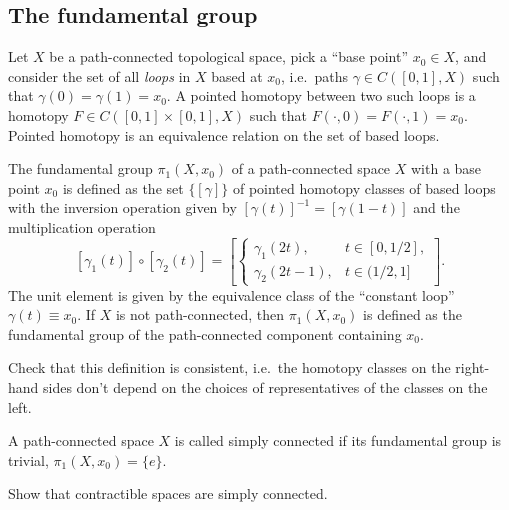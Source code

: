 \subsection{The fundamental group}

\begin{defn}
Let $X$ be a path-connected topological space, pick a ``base point'' $x_0\in X$, and consider the set of all \emph{loops} in $X$ based at $x_0$, i.e.\ paths $\gamma\in C([0,1], X)$ such that $\gamma(0)=\gamma(1)=x_0$. A pointed homotopy between two such loops is a homotopy $F\in C([0,1]\times[0,1],X)$ such that $F(\cdot,0)=F(\cdot,1)=x_0$. Pointed homotopy is an equivalence relation on the set of based loops.
\end{defn}

\begin{defn}
The fundamental group $\pi_1(X,x_0)$ of a path-connected space $X$ with a base point $x_0$ is defined as the set $\{ [\gamma]\}$ of pointed homotopy classes of based loops with the inversion operation given by $[\gamma(t)]^{-1}=[\gamma(1-t)]$ and the multiplication operation 
\[
[\gamma_1(t)]\circ [\gamma_2(t)]=\left[ \begin{cases} \gamma_1(2t), & t\in[0,1/2], \\ \gamma_2(2t-1), & t\in(1/2,1] \end{cases}\right].\label{pi1 group op}
\]
The unit element is given by the equivalence class of the ``constant loop'' $\gamma(t)\equiv x_0$. If $X$ is not path-connected, then $\pi_1(X,x_0)$ is defined as the fundamental group of the path-connected component containing $x_0$.
\end{defn}

\begin{xca}
Check that this definition is consistent, i.e.\ the homotopy classes on the right-hand sides don't depend on the choices of representatives of the classes on the left.
\end{xca}
\begin{defn}
A path-connected space $X$ is called simply connected if its fundamental group is trivial, $\pi_1(X,x_0)=\{e\}$.
\end{defn}

\begin{xca}
Show that contractible spaces are simply connected.
\end{xca}

